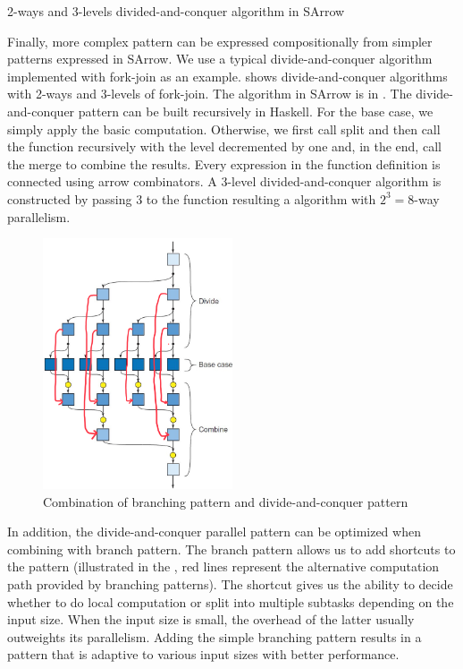 \begin{listing}[ht]
    \inputminted{Haskell}{arrow/dq.hs}
    \caption{2-ways and 3-levels divided-and-conquer algorithm in SArrow}
    \label{SArrow:dq}
\end{listing}

Finally, more complex pattern can be expressed compositionally from simpler patterns expressed in SArrow. We use a typical divide-and-conquer algorithm implemented with fork-join as an example.  shows divide-and-conquer algorithms with 2-ways and 3-levels of fork-join. The algorithm in SArrow is in . The divide-and-conquer pattern can be built recursively in Haskell. For the base case, we simply apply the basic computation. Otherwise, we first call split and then call the function recursively with the level decremented by one and, in the end, call the merge to combine the results. Every expression in the function definition is connected using arrow combinators. A 3-level divided-and-conquer algorithm is constructed by passing 3 to the function resulting a algorithm with $2^3 = 8$-way parallelism.

\begin{figure}[ht]
    \centering
    \includegraphics[width=0.5\textwidth]{arrow/dq2.jpeg}
    \caption{Combination of branching pattern and divide-and-conquer pattern}
    \label{SArrow:fig:brdv}
\end{figure}
In addition, the divide-and-conquer parallel pattern can be optimized when combining with branch pattern. The branch pattern allows us to add shortcuts to the pattern (illustrated in the , red lines represent the alternative computation path provided by branching patterns). The shortcut gives us the ability to decide whether to do local computation or split  into multiple subtasks depending on the input size. When the input size is small, the overhead of the latter usually outweights its parallelism. Adding the simple branching pattern results in a pattern that is adaptive to various input sizes with better performance.

